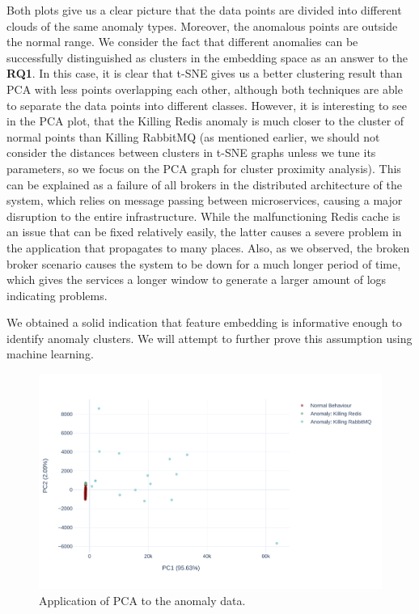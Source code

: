 Both plots give us a clear picture that the data points are divided into different clouds of the same anomaly types. Moreover, the anomalous points are outside the normal range. We consider the fact that different anomalies can be successfully distinguished as clusters in the embedding space as an answer to the \textbf{RQ1}. In this case, it is clear that t-SNE gives us a better clustering result than PCA with less points overlapping each other, although both techniques are able to separate the data points into different classes. However, it is interesting to see in the PCA plot, that the Killing Redis anomaly is much closer to the cluster of normal points than Killing RabbitMQ (as mentioned earlier, we should not consider the distances between clusters in t-SNE graphs unless we tune its parameters, so we focus on the PCA graph for cluster proximity analysis). This can be explained as a failure of all brokers in the distributed architecture of the system, which relies on message passing between microservices, causing a major disruption to the entire infrastructure. 
While the malfunctioning Redis cache is an issue that can be fixed relatively easily, the latter causes a severe problem in the application that propagates to many places. Also, as we observed, the broken broker scenario causes the system to be down for a much longer period of time, which gives the services a longer window to generate a larger amount of logs indicating problems.

We obtained a solid indication that feature embedding is informative enough to identify anomaly clusters. We will attempt to further prove this assumption using machine learning.

\begin{figure}[!h]
    \centering
    \includegraphics[width=\textwidth]{img/pca-anomalies-vs-normal.pdf}
    \caption{Application of PCA to the anomaly data.}
    \label{fig:pca-anomalies}
\end{figure}

